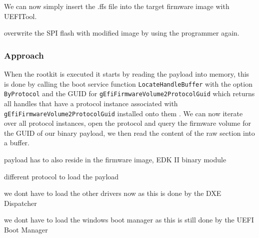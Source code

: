 We can now simply insert the .ffs file into the target firmware image with UEFITool.

overwrite the SPI flash with modified image by using the programmer again.

\subsubsection{Approach}

When the rootkit is executed it starts by reading the payload into memory, this is done by calling the boot service function \lstinline{LocateHandleBuffer} with the option \lstinline{ByProtocol} and the \ac{GUID} for \lstinline{gEfiFirmwareVolume2ProtocolGuid} which returns all handles that have a protocol instance associated with \lstinline{gEfiFirmwareVolume2ProtocolGuid} installed onto them \cite[7.3]{uefi-spec}. We can now iterate over all protocol instances, open the protocol and query the firmware volume for the \ac{GUID} of our binary payload, we then read the content of the raw section into a buffer. 

payload has to also reside in the firmware image, EDK II binary module

different protocol to load the payload

we dont have to load the other drivers now as this is done by the DXE Dispatcher

we dont have to load the windows boot manager as this is still done by the UEFI Boot Manager